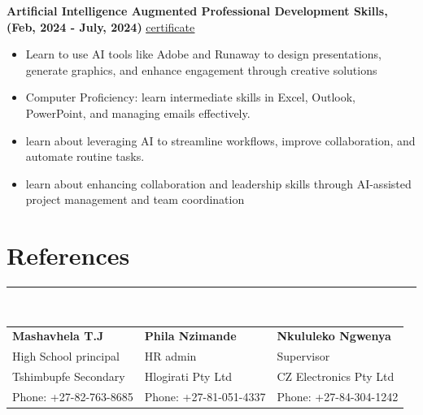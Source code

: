 \documentclass[12pt]{article}
\begin{document}
\hspace{-7mm}\textbf{Artificial Intelligence Augmented Professional Development Skills, (Feb, 2024 - July, 2024)} \hspace{10mm} \href{https://drive.google.com/file/d/16H-T0WN2AVSkl41QqBcLdgBtYbnxJytG/view?usp=sharing}{\underline{certificate}}
\vspace{-3mm}
\begin{itemize}
  \item \fontsize{9}{1}Learn to use AI tools like Adobe and Runaway to design presentations, generate graphics, and enhance engagement through creative solutions
  \vspace{-3mm}
  \item Computer Proficiency: learn intermediate skills in Excel, Outlook, PowerPoint, and managing emails effectively.
  \vspace{-3mm}
  \item learn about leveraging AI to streamline workflows, improve collaboration, and automate routine tasks.
  \vspace{-3mm}
  \item learn about enhancing collaboration and leadership skills through AI-assisted project management and team coordination
  \vspace{-3mm}
\end{itemize}

\vspace{-3mm}\section*{\fontsize{14}{1}\selectfont\color{color_29791}References}\vspace{-9pt} 
\rule{\textwidth}{0.4pt}
\vspace{2pt}\\
\begin{tabular}{p{} p{} p{}}
  \textbf{Mashavhela T.J} & 
  \textbf{Phila Nzimande} & 
  \textbf{Nkululeko Ngwenya} \\
  High School principal & 
  HR admin& 
  Supervisor\\
  Tshimbupfe Secondary & 
  Hlogirati Pty Ltd& 
  CZ Electronics Pty Ltd\\ 
  Phone: +27-82-763-8685  & 
  Phone: +27-81-051-4337 & 
  Phone: +27-84-304-1242 \\
\end{tabular}
\end{document}
